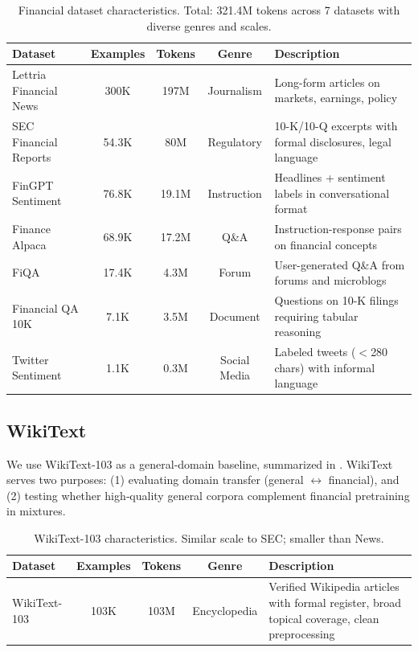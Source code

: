 \begin{table}[h]
\centering
\caption[Financial Dataset Characteristics]{Financial dataset characteristics. Total: 321.4M tokens across 7 datasets with diverse genres and scales.}
\label{tab:financial_datasets}
\small
\begin{tabular}{p{3cm}cccp{5.5cm}}
\toprule
\textbf{Dataset} & \textbf{Examples} & \textbf{Tokens} & \textbf{Genre} & \textbf{Description} \\
\midrule
Lettria Financial News & 300K & 197M & Journalism & Long-form articles on markets, earnings, policy \\
\midrule
SEC Financial Reports & 54.3K & 80M & Regulatory & 10-K/10-Q excerpts with formal disclosures, legal language \\
\midrule
FinGPT Sentiment & 76.8K & 19.1M & Instruction & Headlines + sentiment labels in conversational format \\
\midrule
Finance Alpaca & 68.9K & 17.2M & Q\&A & Instruction-response pairs on financial concepts \\
\midrule
FiQA & 17.4K & 4.3M & Forum & User-generated Q\&A from forums and microblogs \\
\midrule
Financial QA 10K & 7.1K & 3.5M & Document & Questions on 10-K filings requiring tabular reasoning \\
\midrule
Twitter Sentiment & 1.1K & 0.3M & Social Media & Labeled tweets ($<$280 chars) with informal language \\
\bottomrule
\end{tabular}
\end{table}

\subsection{WikiText}

We use WikiText‑103 \parencite{merity2016pointer} as a general‑domain baseline, summarized in . WikiText serves two purposes: (1) evaluating domain transfer (general $\leftrightarrow$ financial), and (2) testing whether high‑quality general corpora complement financial pretraining in mixtures.

\begin{table}[h]
\centering
\caption[WikiText Dataset Characteristics]{WikiText-103 characteristics. Similar scale to SEC; smaller than News.}
\label{tab:wikitext_dataset}
\small
\begin{tabular}{p{3cm}cccp{5.5cm}}
\toprule
\textbf{Dataset} & \textbf{Examples} & \textbf{Tokens} & \textbf{Genre} & \textbf{Description} \\
\midrule
WikiText-103 & 103K & 103M & Encyclopedia & Verified Wikipedia articles with formal register, broad topical coverage, clean preprocessing \\
\bottomrule
\end{tabular}
\end{table}

